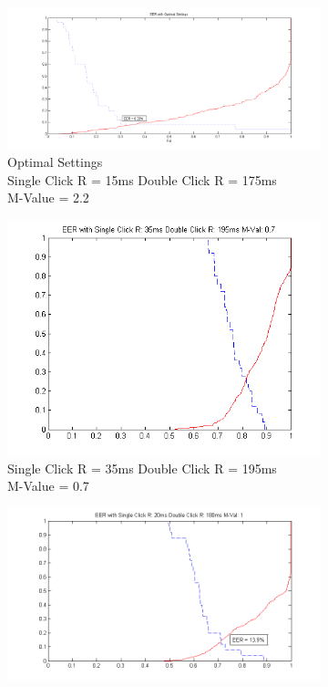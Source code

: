 \documentclass[conference]{IEEEtran}
\begin{document}
\begin{figure}[t!]
\begin{subfigure}{.5\textwidth}
  \centering
  \includegraphics[width=.8\linewidth]{Optimal}
  \caption{Optimal Settings\\Single Click R = 15ms Double Click R = 175ms\\M-Value = 2.2}
  \label{fig:sfig1}
\end{subfigure}%
\begin{subfigure}{.5\textwidth}
  \centering
  \includegraphics[width=.8\linewidth]{7M}
  \caption{Single Click R = 35ms Double Click R = 195ms\\M-Value = 0.7}
  \label{fig:sfig2}
\end{subfigure}
\begin{subfigure}{.5\textwidth}
  \centering
  \includegraphics[width=.8\linewidth]{M1}

\end{subfigure}
\end{figure}
\end{document}
